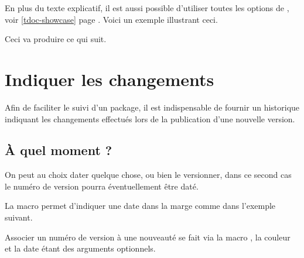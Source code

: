 \begin{tdocexa}
    En plus du texte explicatif, il est aussi possible d'utiliser toutes les options de , voir \ref{tdoc-showcase} page \pageref{tdoc-showcase}.
    Voici un exemple illustrant ceci.

    \medskip


    \medskip

    Ceci va produire ce qui suit.

    \medskip

    \begin{tdoc-doc-showcase}
        
    \end{tdoc-doc-showcase}
\end{tdocexa}


\section{Indiquer les changements}

Afin de faciliter le suivi d'un package, il est indispensable de fournir un historique indiquant les changements effectués lors de la publication d'une nouvelle version.




\subsection{À quel moment ?}

On peut au choix dater quelque chose, ou bien le versionner, dans ce second cas le numéro de version pourra éventuellement être daté.




\begin{tdocexa}
    La macro  permet d'indiquer une date dans la marge comme dans l'exemple suivant.

\end{tdocexa}




\begin{tdocexa}
    Associer un numéro de version à une nouveauté se fait via la macro , la couleur et la date étant des arguments optionnels.

\end{tdocexa}


